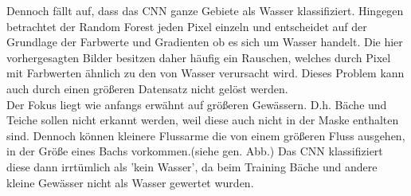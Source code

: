Dennoch fällt auf, dass das CNN ganze Gebiete als Wasser klassifiziert.
Hingegen betrachtet der Random Forest jeden Pixel einzeln und entscheidet auf der Grundlage der Farbwerte und Gradienten ob es sich um Wasser handelt.
Die hier vorhergesagten Bilder besitzen daher häufig ein Rauschen, welches durch Pixel mit Farbwerten ähnlich zu den von Wasser verursacht wird.
Dieses Problem kann auch durch einen größeren Datensatz nicht gelöst werden.
\\
Der Fokus liegt wie anfangs erwähnt auf größeren Gewässern.
D.h. Bäche und Teiche sollen nicht erkannt werden, weil diese auch nicht in der Maske enthalten sind.
Dennoch können kleinere Flussarme die von einem größeren Fluss ausgehen, in der Größe eines Bachs vorkommen.(siehe gen. Abb.)
Das CNN klassifiziert diese dann irrtümlich als 'kein Wasser', da beim Training Bäche und andere kleine Gewässer nicht als Wasser gewertet wurden.
\\
